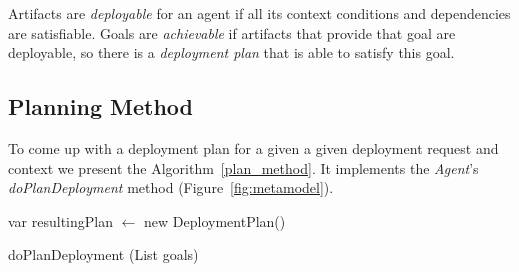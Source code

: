 Artifacts are \emph{deployable} for an agent if all its context conditions and dependencies are satisfiable.
Goals are \emph{achievable} if artifacts that provide that goal are deployable, so there is a \emph{deployment plan} that is able to satisfy this goal.


\subsection{Planning Method}

To come up with a deployment plan for a given a given deployment request and context we present the Algorithm~\ref{plan_method}. It implements the \emph{Agent}'s \emph{doPlanDeployment} method (Figure~\ref{fig:metamodel}).

\begin{algorithm}
  var resultingPlan $\leftarrow$ new DeploymentPlan() \;


  \caption{doPlanDeployment (List goals)}
  \label{plan_method}
\end{algorithm}

